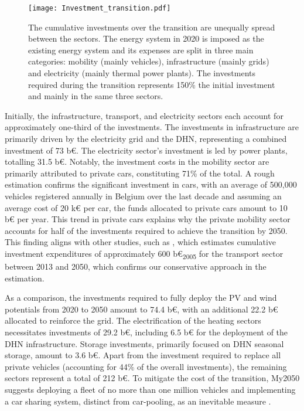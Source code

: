 \begin{figure}[!htbp]
\centering
\texttt{[image: Investment\_transition.pdf]}
\caption{The cumulative investments over the transition are unequally spread between the sectors. The energy system in 2020 is imposed as the existing energy system and its expenses are split in three main categories: mobility (mainly vehicles), infrastructure (mainly grids) and electricity (mainly thermal power plants). The investments required during the transition represents 150\% the initial investment and mainly in the same three sectors. }
\label{fig:pestd_cumul_inv}
\end{figure}

Initially, the infrastructure, transport, and electricity sectors each account for approximately one-third of the investments. The investments in infrastructure are primarily driven by the electricity grid and the \acrfull{DHN}, representing a combined investment of 73 b€. The electricity sector's investment is led by power plants, totalling 31.5 b€. Notably, the investment costs in the mobility sector are primarily attributed to private cars, constituting 71\% of the total. A rough estimation confirms the significant investment in cars, with an average of 500,000 vehicles registered annually in Belgium over the last decade \cite{febiac2021datadigest} and assuming an average cost of 20 k€ per car, the funds allocated to private cars amount to 10 b€ per year. This trend in private cars explains why the private mobility sector accounts for half of the investments required to achieve the transition by 2050. This finding aligns with other studies, such as \citet{Devogelaer2013}, which estimates cumulative investment expenditures of approximately 600 b€\textsubscript{2005} for the transport sector between 2013 and 2050, which confirms our conservative approach in the estimation.


As a comparison, the investments required to fully deploy the PV and wind potentials from 2020 to 2050 amount to 74.4 b€, with an additional 22.2 b€ allocated to reinforce the grid. The electrification of the heating sectors necessitates investments of 29.2 b€, including 6.5 b€ for the deployment of the \gls{DHN} infrastructure. Storage investments, primarily focused on \gls{DHN} seasonal storage, amount to 3.6 b€. Apart from the investment required to replace all private vehicles (accounting for 44\% of the overall investments), the remaining sectors represent a total of 212 b€. To mitigate the cost of the transition, My2050 suggests deploying a fleet of no more than one million vehicles and implementing a car sharing system, distinct from car-pooling, as an inevitable measure \cite{My2050}.

